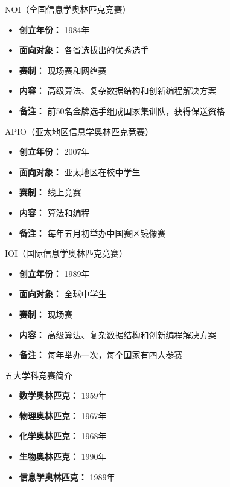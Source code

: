 \documentclass[landscape, 320mm, 180mm]{beamer}
\begin{document}
\begin{frame}{NOI（全国信息学奥林匹克竞赛）}
    \begin{itemize}
        \item \textbf{创立年份：} 1984年
        \item \textbf{面向对象：} 各省选拔出的优秀选手
        \item \textbf{赛制：} 现场赛和网络赛
        \item \textbf{内容：} 高级算法、复杂数据结构和创新编程解决方案
        \item \textbf{备注：} 前50名金牌选手组成国家集训队，获得保送资格
    \end{itemize}
\end{frame}

\begin{frame}{APIO（亚太地区信息学奥林匹克竞赛）}
    \begin{itemize}
        \item \textbf{创立年份：} 2007年
        \item \textbf{面向对象：} 亚太地区在校中学生
        \item \textbf{赛制：} 线上竞赛
        \item \textbf{内容：} 算法和编程
        \item \textbf{备注：} 每年五月初举办中国赛区镜像赛
    \end{itemize}
\end{frame}

\begin{frame}{IOI（国际信息学奥林匹克竞赛）}
    \begin{itemize}
        \item \textbf{创立年份：} 1989年
        \item \textbf{面向对象：} 全球中学生
        \item \textbf{赛制：} 现场赛
        \item \textbf{内容：} 高级算法、复杂数据结构和创新编程解决方案
        \item \textbf{备注：} 每年举办一次，每个国家有四人参赛
    \end{itemize}
\end{frame}

\begin{frame}{五大学科竞赛简介}
    \begin{itemize}
        \item \textbf{数学奥林匹克：} 1959年
        \item \textbf{物理奥林匹克：} 1967年
        \item \textbf{化学奥林匹克：} 1968年
        \item \textbf{生物奥林匹克：} 1990年
        \item \textbf{信息学奥林匹克：} 1989年
    \end{itemize}
\end{frame}
\end{document}
